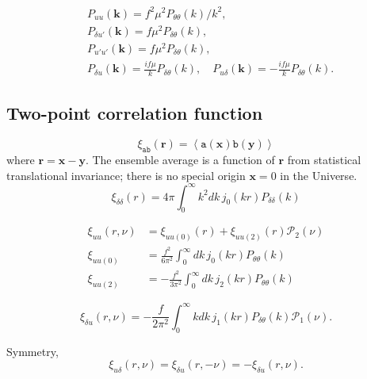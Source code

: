 \documentclass[a4paper,11pt, fleqn]{article}
\begin{document}
\begin{align}
  &P_{uu}(\bm{k}) = f^2\mu^2 P_{\theta\theta}(k)/k^2,\\
  &P_{\delta u'}(\bm{k}) = f \mu^2 P_{\delta \theta}(k),\\
  &P_{u' u'}(\bm{k}) = f \mu^2 P_{\delta \theta}(k),\\
  &P_{\delta u}(\bm{k}) = \frac{if\mu}{k} P_{\delta \theta}(k), \quad
  P_{u \delta}(\bm{k}) = -\frac{if\mu}{k} P_{\delta \theta}(k).
\end{align}


\clearpage
\subsection{Two-point correlation function}

\begin{equation}
  \xi_{\mathtt{ab}}(\bm{r}) = \left\langle \mathtt{a}(\bm{x}) \mathtt{b}(\bm{y})
                             \right\rangle
\end{equation}
%
where $\bm{r} = \bm{x} - \bm{y}$. The ensemble average is a function
of $\bm{r}$ from statistical translational invariance; there is no
special origin $\bm{x} = 0$ in the Universe.\\

\begin{equation}
  \xi_{\delta\delta}(r) = 4\pi \int_0^\infty \! k^2 dk\,
  j_0(kr) P_{\delta\delta}(k)
\end{equation}

\begin{align}
  \xi_{uu}(r, \nu) &= \xi_{uu(0)}(r) + \xi_{uu(2)}(r) \mathcal{P}_2(\nu)\\
  \xi_{uu(0)} &= \frac{f^2}{6 \pi^2} \int_0^\infty \!dk\,
                   j_0(kr) P_{\theta\theta}(k)\\
  \xi_{uu(2)} &= -\frac{f^2}{3 \pi^2} \int_0^\infty \! dk\,
                   j_2(kr) P_{\theta\theta}(k)
\end{align}

\begin{equation}
  \xi_{\delta u}(r, \nu) = -\frac{f}{2\pi^2}
                            \int_0^\infty\! k dk \, j_1(kr) P_{\delta \theta}(k)
                            \mathcal{P}_1(\nu).
\end{equation}

Symmetry,
\begin{equation}
  \xi_{u \delta}(r, \nu) = \xi_{\delta u}(r, -\nu) = -\xi_{\delta u}(r, \nu).
\end{equation}
\end{document}
